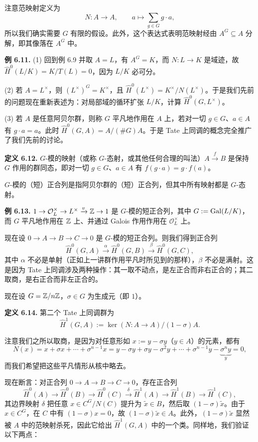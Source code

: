 注意范映射定义为
\[
N\colon A\to A,\qquad a\mapsto\sum_{g\in G}g\cdot a,
\]
所以我们确实需要 $G$ 有限的假设。此外，这个表达式表明范映射经由 $A^G\subseteq A$ 分解，即其像落在 $A^G$ 中。

\textbf{例 6.11.} (1) 回到例 6.9 并取 $A=L$，有 $A^G=K$，而 $N\colon L\to K$ 是域迹，故 $\widehat H^0(L/K)=K/T(L)=0$，因为 $L/K$ 必可分。

(2) 若 $A=L^\times$，则 $(L^\times)^G=K^\times$，且 $\widehat H^0(L^\times)=K^\times/N(L^\times)$。于是我们先前的问题现在重新表述为：对局部域的循环扩张 $L/K$，计算 $\widehat H^0(G,L^\times)$。

(3) 若 $A$ 是任意阿贝尔群，则称 $G$ 平凡地作用在 $A$ 上，若对一切 $g\in G$、$a\in A$ 有 $g\cdot a=a$。此时 $\widehat H^0(G,A)=A/(\#G)A$。于是 Tate 上同调的概念完全推广了我们先前的讨论。

\textbf{定义 6.12.} $G$-模的映射（或称 $G$-态射，或其他任何合理的叫法）$A\xrightarrow{f}B$ 是保持 $G$ 作用的群同态，即对一切 $g\in G$、$a\in A$ 有 $f(g\cdot a)=g\cdot f(a)$。

$G$-模的（短）正合列是指阿贝尔群的（短）正合列，但其中所有映射都是 $G$-态射。

\textbf{例 6.13.} $1\to\mathcal{O}_L^\times\to L^\times\xrightarrow{v}\mathbb{Z}\to1$ 是 $G$-模的短正合列，其中 $G:=\operatorname{Gal}(L/K)$，而 $G$ 平凡地作用在 $\mathbb{Z}$ 上、并通过 Galois 作用作用在 $\mathcal{O}_L^\times$ 上。

现在设 $0\to A\to B\to C\to 0$ 是 $G$-模的短正合列。则我们得到正合列
\begin{equation}\tag{6.4}
\widehat H^0(G,A)\xrightarrow{\ \alpha\ }\widehat H^0(G,B)\xrightarrow{\ \beta\ }\widehat H^0(G,C),
\end{equation}
其中 $\alpha$ 不必是单射（正如上一讲群作用平凡时所见到的那样），$\beta$ 不必是满射。这是因为 Tate 上同调涉及两种操作：其一取不动点，是左正合而非右正合的；其二取商，是右正合而非左正合的。

现在设 $G=\mathbb{Z}/n\mathbb{Z}$，$\sigma\in G$ 为生成元（即 $1$）。

\textbf{定义 6.14.} 第二个 Tate 上同调群为
\[
\widehat H^1(G,A):=\ker(N\colon A\to A)/(1-\sigma)A.
\]

注意我们之所以取商，是因为对任意形如 $x:=y-\sigma y$（$y\in A$）的元素，都有
\[
N(x)=x+\sigma x+\cdots+\sigma^{n-1}x
=y-\sigma y+\sigma y-\sigma^2 y+\cdots+\sigma^{n-1}y-\underbrace{\sigma^{n}y}_{y}=0,
\]
而我们希望把这些平凡情形从核中略去。

现在断言：对正合列 $0\to A\to B\to C\to 0$，存在正合列
\begin{equation}\tag{6.5}
\widehat H^0(A)\to\widehat H^0(B)\to\widehat H^0(C)\xrightarrow{\ \delta\ }
\widehat H^1(A)\to\widehat H^1(B)\to\widehat H^1(C),
\end{equation}
其边界映射 $\delta$ 把任意 $x\in C^G/N(C)$ 提升为 $\tilde x\in B$，然后取 $(1-\sigma)\tilde x$。由于 $x\in C^G$，在 $C$ 中有 $(1-\sigma)x=0$，故 $(1-\sigma)\tilde x\in A$。此外，$(1-\sigma)\tilde x$ 显然被 $A$ 中的范映射杀死，因此它给出 $\widehat H^1(G,A)$ 中的一个类。同样地，我们验证以下两点：

